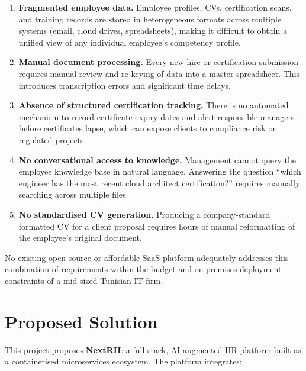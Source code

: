 \documentclass[12pt,a4paper,oneside,openany]{report}
\begin{document}
\begin{enumerate}
  \item \textbf{Fragmented employee data.} Employee profiles, \acp{CV}, certification scans, and training records are stored in heterogeneous formats across multiple systems (email, cloud drives, spreadsheets), making it difficult to obtain a unified view of any individual employee's competency profile.
  \item \textbf{Manual document processing.} Every new hire or certification submission requires manual review and re-keying of data into a master spreadsheet. This introduces transcription errors and significant time delays.
  \item \textbf{Absence of structured certification tracking.} There is no automated mechanism to record certificate expiry dates and alert responsible managers before certificates lapse, which can expose clients to compliance risk on regulated projects.
  \item \textbf{No conversational access to knowledge.} Management cannot query the employee knowledge base in natural language. Answering the question ``which engineer has the most recent cloud architect certification?'' requires manually searching across multiple files.
  \item \textbf{No standardised CV generation.} Producing a company-standard formatted \ac{CV} for a client proposal requires hours of manual reformatting of the employee's original document.
\end{enumerate}

No existing open-source or affordable \ac{SaaS} platform adequately addresses this combination of requirements within the budget and on-premises deployment constraints of a mid-sized Tunisian IT firm.

\section{Proposed Solution}

This project proposes \textbf{NextRH}: a full-stack, AI-augmented \ac{HR} platform built as a containerised microservices ecosystem. The platform integrates:
\end{document}

